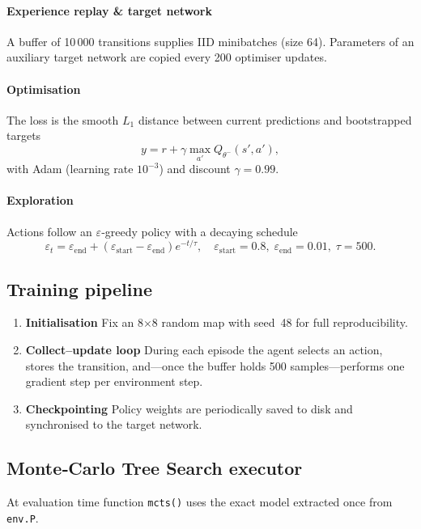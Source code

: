 \documentclass{report}
\begin{document}
\paragraph{Experience replay \& target network} A buffer of 10\,000 transitions supplies IID minibatches (size 64). Parameters of an auxiliary target network are copied every 200 optimiser updates.
 
\paragraph{Optimisation} The loss is the smooth $L_1$ distance between current predictions and bootstrapped targets
\[
  y = r + \gamma \max_{a'} Q_{\theta^{-}}(s',a'),
\]
with Adam (learning rate $10^{-3}$) and discount $\gamma = 0.99$.
 
\paragraph{Exploration} Actions follow an $\varepsilon$‑greedy policy with a decaying schedule
\[
  \varepsilon_t = \varepsilon_{\text{end}} + (\varepsilon_{\text{start}}-\varepsilon_{\text{end}}) e^{-t/\tau}, \quad \varepsilon_{\text{start}}=0.8, \; \varepsilon_{\text{end}}=0.01, \; \tau=500.
\]
 
\subsection{Training pipeline}
\begin{enumerate}
  \item \textbf{Initialisation} Fix an 8$\times$8 random map with seed~48 for full reproducibility.
  \item \textbf{Collect–update loop} During each episode the agent selects an action, stores the transition, and—once the buffer holds 500 samples—performs one gradient step per environment step.
  \item \textbf{Checkpointing} Policy weights are periodically saved to disk and synchronised to the target network.
\end{enumerate}
 
\subsection{Monte‑Carlo Tree Search executor}
At evaluation time function \texttt{mcts()} uses the exact model extracted once from \texttt{env.P}.
 
\end{document}

